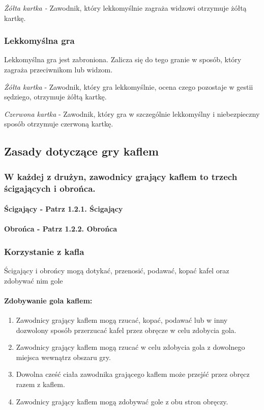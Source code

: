 \documentclass[12pt]{article}
\begin{document}
\emph{Żółta kartka -} Zawodnik, który lekkomyślnie zagraża widzowi
otrzymuje żółtą kartkę.

\subsubsection{Lekkomyślna gra}

Lekkomyślna gra jest zabroniona. Zalicza się do tego granie w sposób,
który zagraża przeciwnikom lub widzom.

\emph{Żółta kartka} - Zawodnik, który gra lekkomyślnie, ocena czego
pozostaje w gestii sędziego, otrzymuje żółtą kartkę.

\emph{Czerwona kartka} - Zawodnik, który gra w szczególnie lekkomyślny i
niebezpieczny sposób otrzymuje czerwoną kartkę.

\subsection{Zasady dotyczące gry kaflem}

\subsubsection{W każdej z drużyn, zawodnicy grający kaflem to trzech ścigających
	i obrońca.}

\paragraph{Ścigający - Patrz 1.2.1. Ścigający}

\paragraph{Obrońca - Patrz 1.2.2. Obrońca}

\subsubsection{Korzystanie z kafla}

Ścigający i obrońcy mogą dotykać, przenosić, podawać, kopać kafel oraz
zdobywać nim gole

\paragraph{Zdobywanie gola kaflem:}

\begin{enumerate}
	\item
	      Zawodnicy grający kaflem mogą rzucać, kopać, podawać lub w inny
	      dozwolony sposób przerzucać kafel przez obręcze w celu zdobycia gola.
	\item
	      Zawodnicy grający kaflem mogą rzucać w celu zdobycia gola z dowolnego
	      miejsca wewnątrz obszaru gry.
	\item
	      Dowolna cześć ciała zawodnika grającego kaflem może przejść przez
	      obręcz razem z kaflem.
	\item
	      Zawodnicy grający kaflem mogą zdobywać gole z obu stron obręczy.
\end{enumerate}
\end{document}
